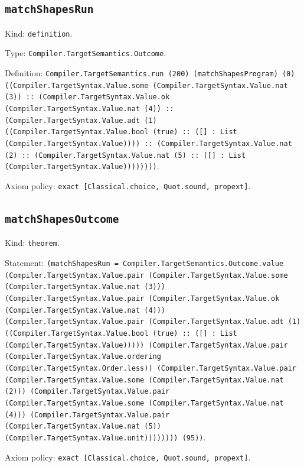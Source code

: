\documentclass[11pt]{article}
\begin{document}
\subsection*{\texttt{matchShapesRun}}
\noindent Kind: \texttt{definition}.\par
\noindent Type: \texttt{Compiler.TargetSemantics.Outcome}.\par
\noindent Definition: \texttt{Compiler.TargetSemantics.run (200) (matchShapesProgram) (0) ((Compiler.TargetSyntax.Value.some (Compiler.TargetSyntax.Value.nat (3)) :: (Compiler.TargetSyntax.Value.ok (Compiler.TargetSyntax.Value.nat (4)) :: (Compiler.TargetSyntax.Value.adt (1) ((Compiler.TargetSyntax.Value.bool (true) :: ([] : List (Compiler.TargetSyntax.Value)))) :: (Compiler.TargetSyntax.Value.nat (2) :: (Compiler.TargetSyntax.Value.nat (5) :: ([] : List (Compiler.TargetSyntax.Value))))))))}.\par
\noindent Axiom policy: \texttt{exact [Classical.choice, Quot.sound, propext]}.\par
\subsection*{\texttt{matchShapesOutcome}}
\noindent Kind: \texttt{theorem}.\par
\noindent Statement: \texttt{(matchShapesRun = Compiler.TargetSemantics.Outcome.value (Compiler.TargetSyntax.Value.pair (Compiler.TargetSyntax.Value.some (Compiler.TargetSyntax.Value.nat (3))) (Compiler.TargetSyntax.Value.pair (Compiler.TargetSyntax.Value.ok (Compiler.TargetSyntax.Value.nat (4))) (Compiler.TargetSyntax.Value.pair (Compiler.TargetSyntax.Value.adt (1) ((Compiler.TargetSyntax.Value.bool (true) :: ([] : List (Compiler.TargetSyntax.Value))))) (Compiler.TargetSyntax.Value.pair (Compiler.TargetSyntax.Value.ordering (Compiler.TargetSyntax.Order.less)) (Compiler.TargetSyntax.Value.pair (Compiler.TargetSyntax.Value.some (Compiler.TargetSyntax.Value.nat (2))) (Compiler.TargetSyntax.Value.pair (Compiler.TargetSyntax.Value.some (Compiler.TargetSyntax.Value.nat (4))) (Compiler.TargetSyntax.Value.pair (Compiler.TargetSyntax.Value.nat (5)) (Compiler.TargetSyntax.Value.unit)))))))) (95))}.\par
\noindent Axiom policy: \texttt{exact [Classical.choice, Quot.sound, propext]}.\par
\end{document}
